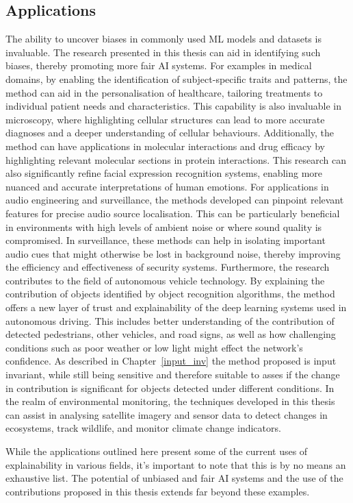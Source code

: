 \subsection{Applications}
The ability to uncover biases in commonly used ML models and datasets is invaluable. The research presented in this thesis can aid in identifying such biases, thereby promoting more fair AI systems. For examples in medical domains, by enabling the identification of subject-specific traits and patterns, the method can aid in the personalisation of healthcare, tailoring treatments to individual patient needs and characteristics. This capability is also invaluable in microscopy, where highlighting cellular structures can lead to more accurate diagnoses and a deeper understanding of cellular behaviours. Additionally, the method can have applications in molecular interactions and drug efficacy by highlighting relevant molecular sections in protein interactions. This research can also significantly refine facial expression recognition systems, enabling more nuanced and accurate interpretations of human emotions. For applications in audio engineering and surveillance, the methods developed can pinpoint relevant features for precise audio source localisation. This can be particularly beneficial in environments with high levels of ambient noise or where sound quality is compromised. In surveillance, these methods can help in isolating important audio cues that might otherwise be lost in background noise, thereby improving the efficiency and effectiveness of security systems. Furthermore, the research contributes to the field of autonomous vehicle technology. By explaining the contribution of objects identified by object recognition algorithms, the method offers a new layer of trust and explainability of the deep learning systems used in autonomous driving. This includes better understanding of the contribution of detected pedestrians, other vehicles, and road signs, as well as how challenging conditions such as poor weather or low light might effect the network's confidence. As described in Chapter~\ref{input_inv} the method proposed is input invariant, while still being sensitive and therefore suitable to asses if the change in contribution is significant for objects detected under different conditions. In the realm of environmental monitoring, the techniques developed in this thesis can assist in analysing satellite imagery and sensor data to detect changes in ecosystems, track wildlife, and monitor climate change indicators. 

While the applications outlined here present some of the current uses of explainability in various fields, it's important to note that this is by no means an exhaustive list. The potential of unbiased and fair AI systems and the use of the contributions proposed in this thesis extends far beyond these examples. 


